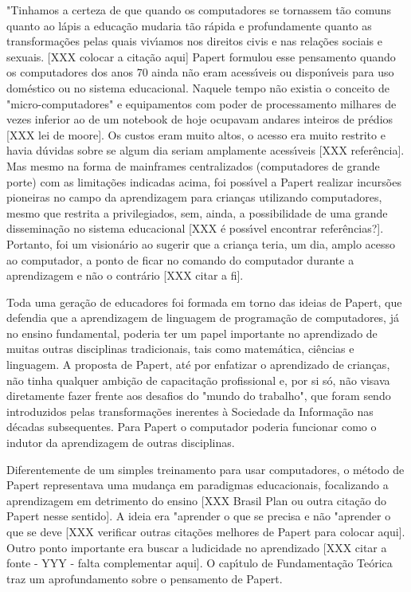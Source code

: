 \documentclass[
12pt,		%
openright,	%
twoside,  %
a4paper,			%
chapter=TITLE,		%
english,			%
french,				%
spanish,			%
brazil				%
]{USPSC-classe/USPSC}
\begin{document}
"Tinhamos  a certeza de que quando os computadores se tornassem t\~ao comuns quanto ao l\'apis a educa\c{c}\~ao mudaria t\~ao r\'apida e profundamente quanto as transforma\c{c}\~oes pelas quais viv\'{\i}amos nos direitos civis e nas rela\c{c}\~oes sociais e sexuais. [XXX colocar a cita\c{c}\~ao aqui]
Papert formulou esse pensamento quando os computadores dos anos 70 ainda n\~ao eram acess\'{\i}veis ou dispon\'{\i}veis para uso dom\'estico ou no sistema educacional. Naquele tempo n\~ao existia o conceito de "micro-computadores" e equipamentos com poder de processamento milhares de vezes inferior ao de um notebook de hoje ocupavam andares inteiros de pr\'edios [XXX lei de moore]. Os custos eram muito altos, o acesso era muito restrito e havia d\'uvidas sobre se algum dia seriam amplamente acess\'{\i}veis [XXX refer\^encia]. Mas mesmo na forma de mainframes centralizados (computadores de grande porte) com as limita\c{c}\~oes indicadas acima, foi poss\'{\i}vel a Papert realizar incurs\~oes pioneiras no campo da aprendizagem para crian\c{c}as utilizando computadores, mesmo que restrita a privilegiados, sem, ainda, a possibilidade de uma grande dissemina\c{c}\~ao no sistema educacional [XXX \'e poss\'{\i}vel encontrar refer\^encias?].  Portanto, foi um vision\'ario ao sugerir que a crian\c{c}a teria, um dia, amplo acesso ao computador, a ponto de ficar no comando do computador durante a aprendizagem e n\~ao o contr\'ario [XXX citar a fi].


Toda uma gera\c{c}\~ao de educadores foi formada em torno das ideias de Papert, que defendia que a aprendizagem de linguagem de programa\c{c}\~ao de computadores, j\'a no ensino fundamental, poderia ter um papel importante no aprendizado de muitas outras disciplinas tradicionais, tais como matem\'atica, ci\^encias e linguagem. A proposta de Papert, at\'e por enfatizar o aprendizado de crian\c{c}as, n\~ao tinha qualquer ambi\c{c}\~ao de capacita\c{c}\~ao profissional e, por si s\'o, n\~ao visava diretamente fazer frente aos desafios do "mundo do trabalho", que foram sendo introduzidos pelas transforma\c{c}\~oes inerentes \`a Sociedade da Informa\c{c}\~ao nas d\'ecadas subsequentes. Para Papert o computador poderia funcionar como o indutor da aprendizagem de outras disciplinas.


Diferentemente de um simples treinamento para usar computadores, o m\'etodo de Papert representava uma mudan\c{c}a em paradigmas educacionais, focalizando a aprendizagem em detrimento do ensino [XXX Brasil Plan ou outra cita\c{c}\~ao do Papert nesse sentido]. A ideia era "aprender o que se precisa e n\~ao "aprender o que se deve [XXX verificar outras cita\c{c}\~oes melhores de Papert para colocar aqui]. Outro ponto importante era buscar a ludicidade no aprendizado [XXX citar a fonte - YYY - falta complementar aqui]. O cap\'{\i}tulo de Fundamenta\c{c}\~ao Te\'orica traz um aprofundamento sobre o pensamento de Papert.
\end{document}
